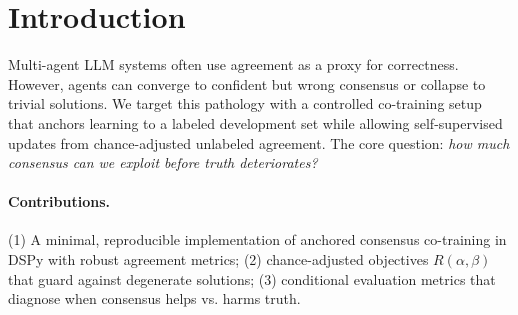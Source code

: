 \documentclass[11pt]{article}
\title{\papertitle}
\author{\paperauthors \\ \paperaffiliations \\ \texttt{\paperemails}}
\date{\today}
\begin{document}
\maketitle

\begin{abstract}
Multi-agent LLM systems frequently exhibit a dangerous failure mode: \emph{confident consensus on incorrect answers}. 
Current approaches lack systematic ways to measure and tune the fundamental trade-off between truth preservation and inter-agent agreement.
We present \textbf{Folie à Deux}, a framework that makes this ``agreement without truth'' problem quantifiable and tunable.
Two verifiers independently judge factual yes/no claims while being teleprompted via DSPy to improve over time.
At each iteration, we optimize a robust objective that trades off \emph{truth preservation} against chance-adjusted inter-agent \emph{agreement}:
\begin{equation*}
R(\alpha, \beta) = \alpha \cdot \mathrm{Truth} + (1-\alpha) \cdot \kappa - \beta \cdot \mathrm{Degeneracy}, \qquad \alpha, \beta \in [0, 1].
\end{equation*}
This formulation makes the failure mode of ``agreement without truth'' measurable and tunable while guarding against label collapse.
We provide an open-source implementation built on DSPy with support for local inference via Ollama (default: \texttt{llama3.1:8b}) and report ablations across $\alpha$ values with conditional accuracy metrics to demonstrate the truth--consensus trade-off.
\end{abstract}

\section{Introduction}
Multi-agent LLM systems often use agreement as a proxy for correctness.
However, agents can converge to confident but wrong consensus or collapse to trivial solutions.
We target this pathology with a controlled co-training setup that anchors learning to a labeled development set while allowing self-supervised updates from chance-adjusted unlabeled agreement.
The core question: \emph{how much consensus can we exploit before truth deteriorates?}

\paragraph{Contributions.}
(1) A minimal, reproducible implementation of anchored consensus co-training in DSPy with robust agreement metrics; (2) chance-adjusted objectives $R(\alpha, \beta)$ that guard against degenerate solutions; (3) conditional evaluation metrics that diagnose when consensus helps vs. harms truth.
\end{document}
